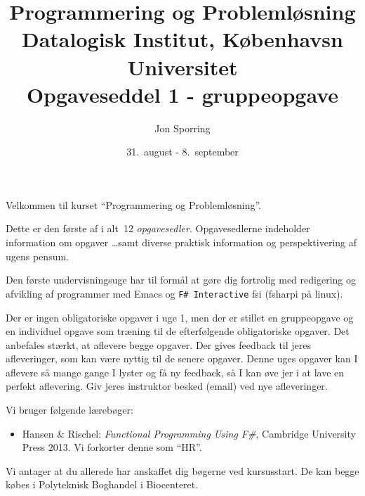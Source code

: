 \documentclass[a4paper,12pt]{article}
\title{Programmering og Problemløsning\\Datalogisk Institut,
  Københavsn Universitet\\Opgaveseddel 1 - gruppeopgave}
\author{Jon Sporring}
\date{31.\ august - 8.\ september}
\newcommand{\fsi}{\texttt{F\# Interactive} }
\begin{document}
\maketitle

Velkommen til kurset ``Programmering og Problemløsning''.

Dette er den første af i alt~12 \emph{opgavesedler}. Opgavesedlerne indeholder information om opgaver \dots samt diverse praktisk information og perspektivering af ugens pensum.

Den første undervisningsuge har til formål at gøre dig fortrolig med
redigering og afvikling af programmer med Emacs og \fsi fsi (fsharpi på linux).

Der er ingen obligatoriske opgaver i uge 1, men der er stillet en
gruppeopgave og en individuel opgave som træning til de efterfølgende obligatoriske opgaver. Det anbefales stærkt, at aflevere begge opgaver. Der gives feedback til jeres afleveringer, som kan være nyttig til de senere opgaver.  Denne uges opgaver kan I aflevere så mange gange I lyster og få ny feedback, så I kan øve jer i at lave en perfekt aflevering.  Giv jeres instruktor besked (email) ved nye afleveringer.

Vi bruger følgende lærebøger:

\begin{itemize}
\item Hansen \& Rischel: \textit{Functional Programming Using F\#},
  Cambridge University Press 2013. Vi forkorter denne som ``HR''.
\end{itemize}

Vi antager at du allerede har anskaffet dig bøgerne ved kursusstart. De kan begge købes i Polyteknisk Boghandel i Biocenteret.
\end{document}
